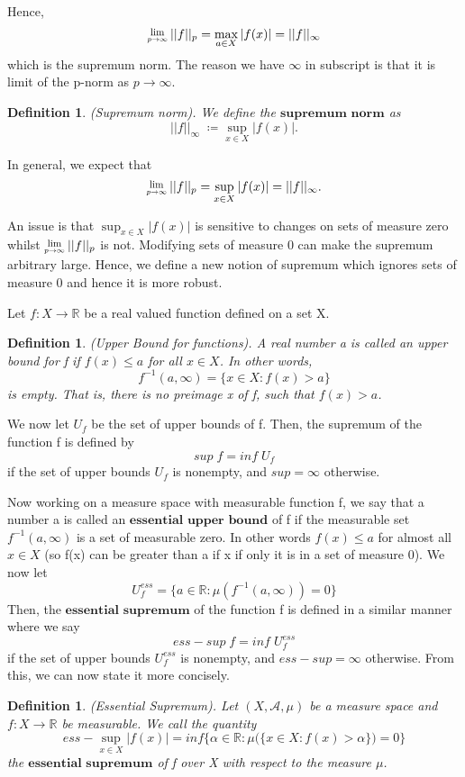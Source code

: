 \documentclass[twoside]{article}
\newcommand{\Lim}[1]{\raisebox{0.5ex}{\scalebox{0.8}{$\displaystyle \lim_{#1}\;$}}}
\newtheorem{definition}[theorem]{Definition}
\begin{document}
Hence,
$$
\Lim{p \rightarrow \infty}||f||_p = \max_{a \in X}|f(x)| = ||f||_{\infty}
$$
which is the supremum norm. The reason we have $\infty$ in subscript is that it is limit of the p-norm as $p \rightarrow \infty$.

\begin{definition}(Supremum norm).
We define the $\textbf{supremum norm}$ as
$$
||f||_{\infty} \; \coloneqq \sup_{x \in X}|f(x)|.
$$
\end{definition}


In general, we expect that
$$
\Lim{p \rightarrow \infty}||f||_p = \sup_{x \in X}|f(x)| = ||f||_{\infty}.
$$

An issue is that $\sup_{x \in X}|f(x)|$ is sensitive to changes on sets of measure zero whilst $\Lim{p \rightarrow \infty}||f||_p$ is not. Modifying sets of measure 0 can make the supremum arbitrary large. Hence, we define a new notion of supremum which ignores sets of measure 0 and hence it is more robust.

\bigskip

Let $f: X \rightarrow \mathbb{R}$ be a real valued function defined on a set X.
\begin{definition}(Upper Bound for functions). A real number a is called an upper bound for f if $f(x) \leq a$ for all $x \in X$. In other words, 
$$
f^{-1}(a, \infty) = \{x \in X: f(x) > a\}
$$
is empty. That is, there is no preimage x of f, such that $f(x) > a$.
\end{definition}

We now let $U_f$ be the set of upper bounds of f. Then, the supremum of the function f is defined by 
$$
sup\;f = inf\;U_f
$$
if the set of upper bounds $U_f$ is nonempty, and $sup = \infty$ otherwise.

 Now working on a measure space with measurable function f, we say that a number a is called an $\textbf{essential upper bound}$ of f if the measurable set $f^{-1}(a, \infty)$ is a set of measurable zero. In other words $f(x) \leq a$ for almost all $x \in X$ (so f(x) can be greater than a if x if only it is in a set of measure 0). We now let
$$
U_f^{ess} = \{a \in \mathbb{R}: \mu(f^{-1}(a, \infty)) = 0\}
$$
Then, the $\textbf{essential supremum}$ of the function f is defined in a similar manner where we say
$$
ess-sup\;f = inf\;U_f^{ess}
$$
if the set of upper bounds $U_f^{ess}$ is nonempty, and $ess-sup = \infty$ otherwise. From this, we can now state it more concisely.


\begin{definition}(Essential Supremum). Let $(X, \mathcal{A}, \mu)$ be a measure space and $f: X \rightarrow \mathbb{R}$ be measurable. We call the quantity
$$
ess-\sup_{x \in X}|f(x)| = inf\{\alpha \in \mathbb{R}: \mu\big(\{x \in X: f(x) > \alpha\}\big) = 0\}
$$
the $\textbf{essential supremum}$ of f over X with respect to the measure $\mu$. 

\end{definition}
\end{document}
